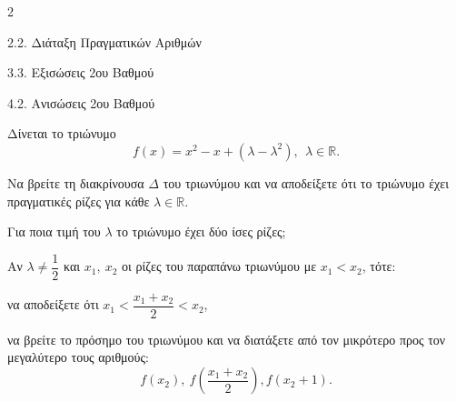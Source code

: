 \begin{ylh}{2}
    \item 2.2. Διάταξη Πραγματικών Αριθμών
    \item 3.3. Εξισώσεις 2ου Βαθμού
    \item 4.2. Ανισώσεις 2ου Βαθμού
\end{ylh}
Δίνεται το τριώνυμο
\begin{equation*}f(x) = x^{2} - x + \left( \lambda - \lambda^{2} \right),\ \ \lambda \in \mathbb{R.}\end{equation*}
\begin{alist}
\item Να βρείτε τη διακρίνουσα $\Delta$ του τριωνύμου και να αποδείξετε ότι το τριώνυμο έχει πραγματικές ρίζες για κάθε $\lambda\mathbb{\in R}$.
\item Για ποια τιμή του $\lambda$ το τριώνυμο έχει δύο ίσες ρίζες;
\item Αν $\lambda \neq \dfrac{1}{2}$ και $x_{1},\ x_{2}$ οι ρίζες του παραπάνω τριωνύμου με $x_{1} < x_{2}$, τότε:

\begin{rlist}
\item
  να αποδείξετε ότι $x_{1} < \dfrac{x_{1} + x_{2}}{2} < x_{2}$,
\item
  να βρείτε το πρόσημο του τριωνύμου και να διατάξετε από τον μικρότερο προς τον μεγαλύτερο τους αριθμούς:
\begin{equation*}f\left( x_{2} \right),\ f\left( \dfrac{x_{1} + x_{2}}{2} \right),f\left( x_{2} + 1 \right).\end{equation*}
\end{rlist}
\end{alist}

